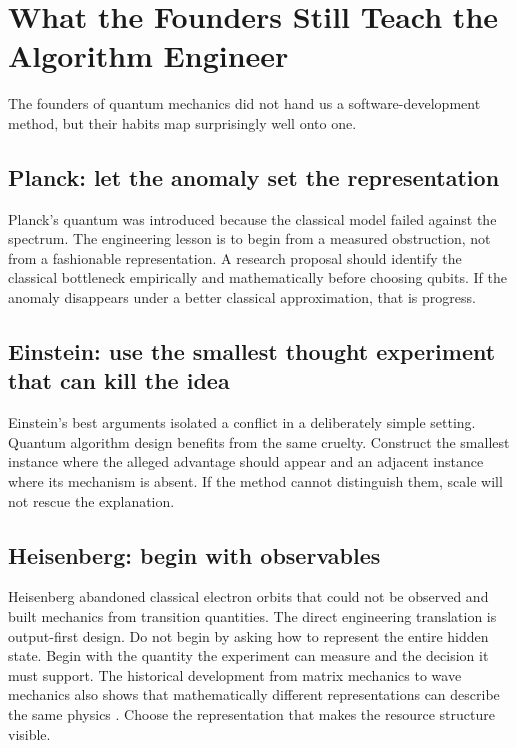 \section{What the Founders Still Teach the Algorithm Engineer}

The founders of quantum mechanics did not hand us a software-development method, but their habits map surprisingly well onto one.

\subsection{Planck: let the anomaly set the representation}

Planck's quantum was introduced because the classical model failed against the spectrum. The engineering lesson is to begin from a measured obstruction, not from a fashionable representation. A research proposal should identify the classical bottleneck empirically and mathematically before choosing qubits. If the anomaly disappears under a better classical approximation, that is progress.

\subsection{Einstein: use the smallest thought experiment that can kill the idea}

Einstein's best arguments isolated a conflict in a deliberately simple setting. Quantum algorithm design benefits from the same cruelty. Construct the smallest instance where the alleged advantage should appear and an adjacent instance where its mechanism is absent. If the method cannot distinguish them, scale will not rescue the explanation.

\subsection{Heisenberg: begin with observables}

Heisenberg abandoned classical electron orbits that could not be observed and built mechanics from transition quantities. The direct engineering translation is output-first design. Do not begin by asking how to represent the entire hidden state. Begin with the quantity the experiment can measure and the decision it must support. The historical development from matrix mechanics to wave mechanics also shows that mathematically different representations can describe the same physics \citep{nobelhistory2000}. Choose the representation that makes the resource structure visible.

